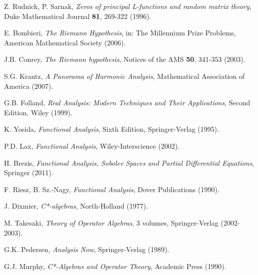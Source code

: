 \documentclass[12pt]{article}
\theoremstyle{plain}
\theoremstyle{definition}
\begin{document}
\begin{thebibliography}{99}
 Z. Rudnick, P. Sarnak, \emph{Zeros of principal L-functions and random matrix theory}, Duke Mathematical Journal \textbf{81}, 269-322 (1996).

 E. Bombieri, \emph{The Riemann Hypothesis}, in: The Millennium Prize Problems, American Mathematical Society (2006).

 J.B. Conrey, \emph{The Riemann hypothesis}, Notices of the AMS \textbf{50}, 341-353 (2003).

 S.G. Krantz, \emph{A Panorama of Harmonic Analysis}, Mathematical Association of America (2007).

 G.B. Folland, \emph{Real Analysis: Modern Techniques and Their Applications}, Second Edition, Wiley (1999).

 K. Yosida, \emph{Functional Analysis}, Sixth Edition, Springer-Verlag (1995).

 P.D. Lax, \emph{Functional Analysis}, Wiley-Interscience (2002).

 H. Brezis, \emph{Functional Analysis, Sobolev Spaces and Partial Differential Equations}, Springer (2011).

 F. Riesz, B. Sz.-Nagy, \emph{Functional Analysis}, Dover Publications (1990).

 J. Dixmier, \emph{C*-algebras}, North-Holland (1977).

 M. Takesaki, \emph{Theory of Operator Algebras}, 3 volumes, Springer-Verlag (2002-2003).

 G.K. Pedersen, \emph{Analysis Now}, Springer-Verlag (1989).

 G.J. Murphy, \emph{C*-Algebras and Operator Theory}, Academic Press (1990).

\end{thebibliography}
\end{document}
